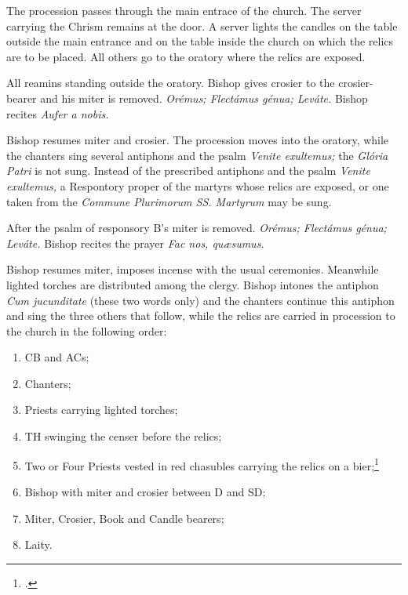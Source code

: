 \documentclass[letterpaper]{report}
\begin{document}
{The procession passes through the main entrace of the church. The server
carrying the Chrism remains at the door. A server lights the candles on the
table outside the main entrance and on the table inside the church on which the
relics are to be placed. All others go to the oratory where the relics are
exposed.

\rubric All reamins standing outside the oratory. Bishop gives crosier to the
crosier-bearer and his miter is removed. \textit{Orémus; Flectámus génua;
Leváte.} Bishop recites \textit{Aufer a nobis.}

\rubric Bishop resumes miter and crosier. The procession moves into the oratory,
while the chanters sing several antiphons and the psalm \textit{Venite
exultemus;} the \textit{Glória Patri} is not sung. Instead of the prescribed
antiphons and the psalm \textit{Venite exultemus,} a Respontory proper of the
martyrs whose relics are exposed, or one taken from the \textit{Commune
Plurimorum SS. Martyrum} may be sung.

\rubric After the psalm of responsory B's miter is removed. \textit{Orémus;
Flectámus génua; Leváte.} Bishop recites the prayer \textit{Fac nos, qu\ae sumus.}

\rubric Bishop resumes miter, imposes incense with the usual ceremonies.
Meanwhile lighted torches are distributed among the clergy. Bishop intones the
antiphon \textit{Cum jucunditate} (these two words only) and the chanters
continue this antiphon and sing the three others that follow, while the relics
are carried in procession to the church in the following order:

\begin{enumerate}
    \item CB and ACs;
    \item Chanters;
    \item Priests carrying lighted torches;
    \item TH swinging the censer before the relics;
    \item Two or Four Priests vested in red chasubles carrying the relics on a
        bier;\footcite[Instead of these priets the consecrator may carry the
        relics on s salver.][footnote 1, p. 81.]{consecranda}
    \item Bishop with miter and crosier between D and SD;
    \item Miter, Crosier, Book and Candle bearers;
    \item Laity.
\end{enumerate}

}
\end{document}
